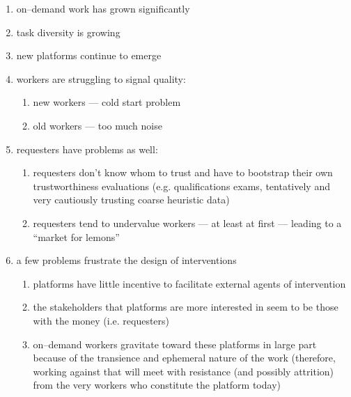 \documentclass[main]{subfiles}
\begin{document}
\begin{enumerate}
  \item on--demand work has grown significantly
  \item task diversity is growing
  \item new platforms continue to emerge
  
  \item workers are struggling to signal quality:
  \begin{enumerate}
     \item new workers --- cold start problem
     \item old workers --- too much noise
  \end{enumerate}
  \item requesters have problems as well:
  \begin{enumerate}
    
    \item requesters don't know whom to trust and have to bootstrap their own trustworthiness evaluations
          (e.g. qualifications exams, tentatively and very cautiously trusting coarse heuristic data)
    \item requesters tend to undervalue workers --- at least at first --- leading to a ``market for lemons''
  \end{enumerate}
  
  \item a few problems frustrate the design of interventions
  \begin{enumerate}
    \item platforms have little incentive to facilitate external agents of intervention
    \item the stakeholders that platforms are more interested in seem to be those with the money (i.e. requesters)
    \item on--demand workers gravitate toward these platforms in large part because of the transience and ephemeral nature of the work
          (therefore, working against that will meet with resistance (and possibly attrition) from the very workers who constitute the platform today)
  \end{enumerate}


\end{enumerate}
\end{document}
